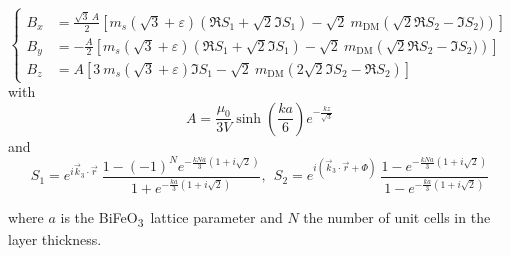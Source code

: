 \documentclass[a4paper,12pt]{article}
\newcommand{\BFO}{BiFeO\textsubscript{3}\ }
\begin{document}
\begin{equation*}
  \left \lbrace
    \begin{aligned}
      B_x & = \frac{\sqrt{3} \  A}{2}  \left[ m_s  (\sqrt{3} + \varepsilon)\left( \Re{S_1} + \sqrt{2} \Im{S_1} \right) - \sqrt{2} \ m_\text{DM} \left( \sqrt{2} \Re{S_2} -  \Im{S_2)}  \right) \right]\\
      B_y &= -\frac{A}{2}   \left[ m_s  (\sqrt{3} + \varepsilon)\left( \Re{S_1} + \sqrt{2} \Im{S_1} \right) - \sqrt{2} \ m_\text{DM} \left(  \sqrt{2} \Re{S_2} - \Im{S_2)}  \right) \right]\\
      B_z & = A  \left[ 3 \ m_s (\sqrt{3}+\varepsilon) \Im{S_1} - \sqrt{2} \ m_\text{DM}(2\sqrt{2} \Im{S_2} - \Re{S_2} ) \right]
    \end{aligned}
  \right. 
\end{equation*}
with
\begin{equation*}
  A = \frac{\mu_0}{3V} \sinh\left( \frac{ka}{6}\right) e^{-\frac{kz}{\sqrt{3}}}
\end{equation*}
and
\begin{equation*}
  S_1  = e^{i\vec{k}_3 \cdot \vec{r}} \ \frac{1-(-1)^Ne^{-\frac{kNa}{3}(1+i\sqrt{2})}}{1 + e^{-\frac{ka}{3}(1+i\sqrt{2})}}, \ \
 S_2  = e^{i(\vec{k}_3 \cdot \vec{r} + \Phi)} \ \frac{1-e^{-\frac{kNa}{3}(1+i\sqrt{2})}}{1 - e^{-\frac{ka}{3}(1+i\sqrt{2})}} 
\end{equation*}

where $a$ is the \BFO lattice parameter and $N$ the number of unit cells in the layer thickness.
\end{document}
